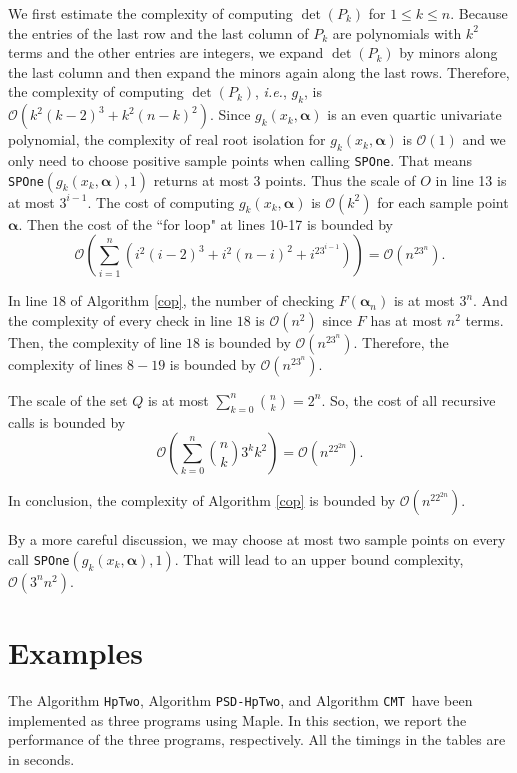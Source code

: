 \documentclass[amsthm]{elsart}
\newcommand{\va}{\bm{\alpha}}
\def \TwoPro {{\tt PSD-HpTwo}}
\def \TwoHp {{\tt HpTwo}}
\def \TCPT {{\tt CMT}}
\def \OO {{\mathcal{O}}}
\begin{document}
We first estimate the complexity of computing $\det(P_k)$ for $1\le k\le n$. Because the entries of the last row and the last column of $P_k$ are polynomials with $k^2$ terms and the other entries are integers, we expand $\det(P_k)$ by minors along the last column and then expand the minors again along the last rows. Therefore, the complexity of computing $\det(P_k)$, {\it i.e.}, $g_k$, is $\OO(k^2(k-2)^3+k^2(n-k)^2)$. Since $g_k(x_k,\va)$ is an even quartic univariate polynomial, the complexity of real root isolation for $g_k(x_k,\va)$ is $\OO(1)$ and we only need to choose positive sample points when calling {\tt SPOne}. That means {\tt SPOne}$(g_k(x_k,\va),1)$ returns at most 3 points. Thus the scale of $O$ in line 13 is at most $3^{i-1}$. The cost of computing $g_k(x_k,\va)$ is $\OO(k^2)$ for each sample point $\va$. Then the cost of the ``for loop" at lines 10-17 is bounded by
$$\OO(\sum_{i=1}^{n}(i^2(i-2)^3+i^2(n-i)^2+i^23^{i-1}))=\OO(n^23^n).$$

In line $18$ of Algorithm \ref{cop}, the number of checking $F(\va_n)$ is at most $3^n$. And the complexity of every check in line $18$ is $\OO(n^2)$ since $F$ has at most $n^2$ terms. Then, the complexity of line $18$ is bounded by $\OO(n^23^n)$. Therefore, the complexity of lines $8-19$ is bounded by $\OO(n^23^n)$.

The scale of the set $Q$ is at most $\sum_{k=0}^{n} {n \choose k}=2^n.$ So, the cost of all recursive calls is bounded by
$$\OO(\sum_{k=0}^n{n \choose k}3^kk^2)=\OO(n^22^{2n}).$$

In conclusion, the complexity of Algorithm \ref{cop} is bounded by $\OO(n^22^{2n}).$


\begin{rem}
By a more careful discussion, we may choose at most two sample points on every call {\tt SPOne}$(g_k(x_k,\va),1)$. That will lead to an upper bound complexity, $\OO(3^n n^2)$.
\end{rem}


\section{Examples}
\label{sec:applicat}

The Algorithm \TwoHp, Algorithm \TwoPro, and Algorithm \TCPT\ have been implemented as three programs using Maple. In this section, we report the performance of the three programs, respectively.
All the timings in the tables are in seconds.
\end{document}
